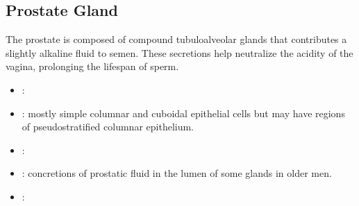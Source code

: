 \subsection{Prostate Gland}
The prostate is composed of compound tubuloalveolar glands that contributes a slightly alkaline fluid to semen. These secretions help neutralize the acidity of the vagina, prolonging the lifespan of sperm.
\begin{center}
\end{center} 
\begin{multicols}{2}
\begin{itemize}
  \item {}: 
  
  \begin{center}
  \end{center}
  
  \item {}: mostly simple columnar and cuboidal epithelial cells but may have regions of pseudostratified columnar epithelium.
  
  \begin{center}
  \end{center}
  
  \item {}:
  
  \begin{center}
  \end{center}
  
  \item {}: concretions of prostatic fluid in the lumen of some glands in older men. 
  
  \begin{center}
  \end{center}
  
  \item {}:
  
  \begin{center}
  \end{center}
  
\end{itemize}
\end{multicols}

